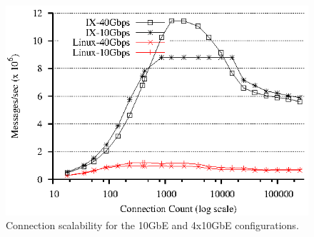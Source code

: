
\begin{figure}
\begin{centering}
\includegraphics{figs/connscaling-throughput.eps}
\caption{Connection scalability for the 10GbE and 4x10GbE configurations.}
\label{fig:connscaling}
\end{centering}
\end{figure}

